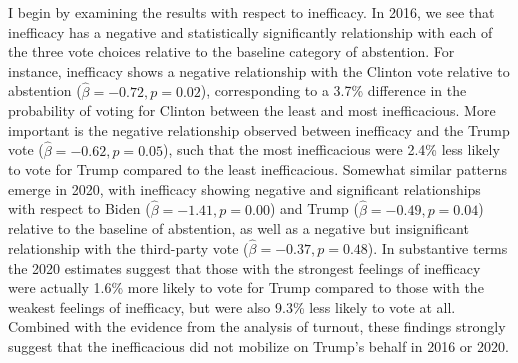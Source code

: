 \documentclass[12pt]{article}
\begin{document}


I begin by examining the results with respect to inefficacy. In 2016, we see that inefficacy has a negative and statistically significantly relationship with each of the three vote choices relative to the baseline category of abstention. For instance, inefficacy shows a negative relationship with the Clinton vote relative to abstention ($\hat{\beta} = -0.72, p = 0.02$), corresponding to a 3.7\% difference in the probability of voting for Clinton between the least and most inefficacious. More important is the negative relationship observed between inefficacy and the Trump vote ($\hat{\beta} = -0.62, p = 0.05$), such that the most inefficacious were 2.4\% less likely to vote for Trump compared to the least inefficacious. Somewhat similar patterns emerge in 2020, with inefficacy showing negative and significant relationships with respect to Biden ($\hat{\beta} = -1.41, p = 0.00$) and Trump ($\hat{\beta} = -0.49, p = 0.04$) relative to the baseline of abstention, as well as a negative but insignificant relationship with the third-party vote ($\hat{\beta} = -0.37, p = 0.48$). In substantive terms the 2020 estimates suggest that those with the strongest feelings of inefficacy were actually 1.6\% more likely to vote for Trump compared to those with the weakest feelings of inefficacy, but were also 9.3\% less likely to vote at all. Combined with the evidence from the analysis of turnout, these findings strongly suggest that the inefficacious did not mobilize on Trump's behalf in 2016 or 2020.

\end{document}
